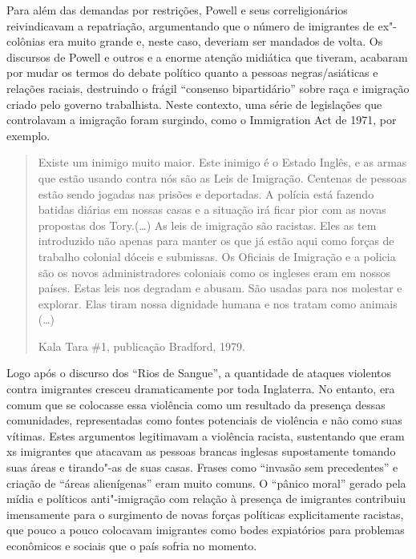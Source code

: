 Para além das demandas por restrições, Powell e seus correligionários reivindicavam a repatriação, argumentando que o número de imigrantes de ex"-colônias era muito grande e, neste caso, deveriam ser mandados de volta. Os discursos de Powell e outros e a enorme atenção midiática que tiveram, acabaram por mudar os termos do debate político quanto a pessoas negras/asiáticas e relações raciais, destruindo o frágil ``consenso bipartidário'' sobre raça e imigração criado pelo governo trabalhista. Neste contexto, uma série de legislações que controlavam a imigração foram surgindo, como o Immigration Act de 1971, por exemplo.

\begin{quote}
Existe um inimigo muito maior. Este inimigo é o Estado Inglês, e as armas que estão usando contra nós são as Leis de Imigração. Centenas de pessoas estão sendo jogadas nas prisões e deportadas. A polícia está fazendo batidas diárias em nossas casas e a situação irá ficar pior com as novas propostas dos Tory.(\ldots{}) As leis de imigração são racistas. Eles as tem introduzido não apenas para manter os que já estão aqui como forças de trabalho colonial dóceis e submissas. Os Oficiais de Imigração e a policia são os novos administradores coloniais como os ingleses eram em nossos países. Estas leis nos degradam e abusam. São usadas para nos molestar e explorar. Elas tiram nossa dignidade humana e nos tratam como animais (\ldots{})

Kala Tara \#1, publicação  Bradford, 1979.
\end{quote}

Logo após o discurso dos ``Rios de Sangue'', a quantidade de ataques violentos contra imigrantes cresceu dramaticamente por toda Inglaterra. No entanto, era comum que se colocasse essa violência como um resultado da presença dessas comunidades, representadas como fontes potenciais de violência e não como suas vítimas. Estes argumentos legitimavam a violência racista, sustentando que eram xs imigrantes que atacavam as pessoas brancas inglesas supostamente tomando suas áreas e tirando"-as de suas casas. Frases como ``invasão sem precedentes'' e criação de ``áreas alienígenas'' eram muito comuns. O ``pânico moral'' gerado pela mídia e políticos anti"-imigração com relação à presença de imigrantes contribuiu imensamente para o surgimento de novas forças políticas explicitamente racistas, que pouco a pouco colocavam imigrantes como bodes expiatórios para problemas econômicos e sociais que o país sofria no momento.

